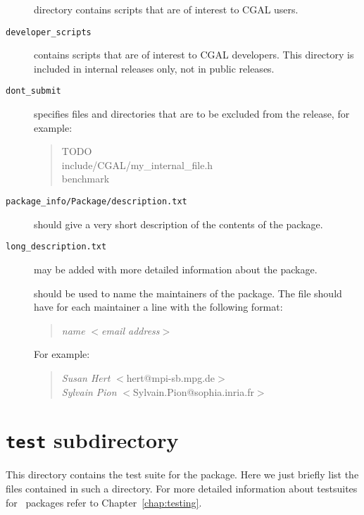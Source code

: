 \begin{description}
{       directory} contains scripts that are of interest to CGAL users.
  \item[{\tt developer\_scripts}] contains
       scripts that are of interest to CGAL developers. This directory
       is included in internal releases only, not in public releases.
  \item[{\tt dont\_submit}]%
     specifies files and directories
    that are to be excluded from the release, for example:
    \begin{verse}
      TODO\\
      include/CGAL/my\_internal\_file.h\\
      benchmark      
    \end{verse}
  \item[{\tt package\_info/Package/description.txt}]%
       should give a very short description of the contents of the package. 
  \item[{\tt long\_description.txt}]%
       may be added with more detailed information about the package. 
  \item[\ccAnchor{maintainer}{{\tt package\_info/Package/maintainer}}]%
       should be used to name the maintainers of the package. The file should
       have for each maintainer a line with the following format:
       \begin{verse}
       {\it name} $<${\it email address}$>$\\
       \end{verse}
       For example:
       \begin{verse}
       {\it Susan Hert} $<$hert@mpi-sb.mpg.de$>$\\
       {\it Sylvain Pion} $<$Sylvain.Pion@sophia.inria.fr$>$\\
       \end{verse}
\end{description}

\section{{\tt test} subdirectory}
\label{sec:test_subdirectory}

This directory contains the test suite for the package. Here we just
briefly list the files contained in such a directory. For more
detailed information about testsuites for \cgal\ packages refer to
Chapter~\ref{chap:testing}. 

